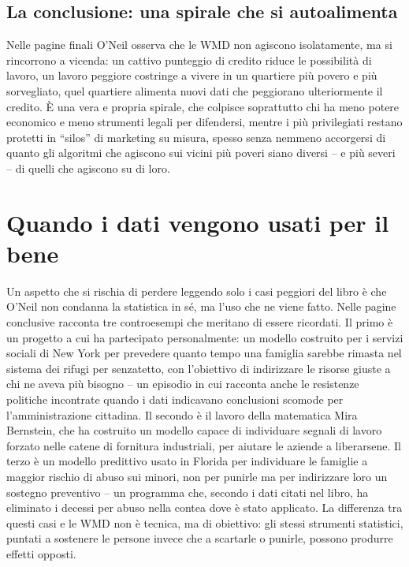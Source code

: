 \documentclass[a4paper,11pt]{article}
\begin{document}
\subsection{La conclusione: una spirale che si autoalimenta}

Nelle pagine finali O'Neil osserva che le WMD non agiscono isolatamente, ma si rincorrono a vicenda: un cattivo punteggio di credito riduce le possibilità di lavoro, un lavoro peggiore costringe a vivere in un quartiere più povero e più sorvegliato, quel quartiere alimenta nuovi dati che peggiorano ulteriormente il credito. È una vera e propria spirale, che colpisce soprattutto chi ha meno potere economico e meno strumenti legali per difendersi, mentre i più privilegiati restano protetti in ``silos'' di marketing su misura, spesso senza nemmeno accorgersi di quanto gli algoritmi che agiscono sui vicini più poveri siano diversi -- e più severi -- di quelli che agiscono su di loro.

\section{Quando i dati vengono usati per il bene}

Un aspetto che si rischia di perdere leggendo solo i casi peggiori del libro è che O'Neil non condanna la statistica in sé, ma l'uso che ne viene fatto. Nelle pagine conclusive racconta tre controesempi che meritano di essere ricordati. Il primo è un progetto a cui ha partecipato personalmente: un modello costruito per i servizi sociali di New York per prevedere quanto tempo una famiglia sarebbe rimasta nel sistema dei rifugi per senzatetto, con l'obiettivo di indirizzare le risorse giuste a chi ne aveva più bisogno -- un episodio in cui racconta anche le resistenze politiche incontrate quando i dati indicavano conclusioni scomode per l'amministrazione cittadina. Il secondo è il lavoro della matematica Mira Bernstein, che ha costruito un modello capace di individuare segnali di lavoro forzato nelle catene di fornitura industriali, per aiutare le aziende a liberarsene. Il terzo è un modello predittivo usato in Florida per individuare le famiglie a maggior rischio di abuso sui minori, non per punirle ma per indirizzare loro un sostegno preventivo -- un programma che, secondo i dati citati nel libro, ha eliminato i decessi per abuso nella contea dove è stato applicato. La differenza tra questi casi e le WMD non è tecnica, ma di obiettivo: gli stessi strumenti statistici, puntati a sostenere le persone invece che a scartarle o punirle, possono produrre effetti opposti.
\end{document}
